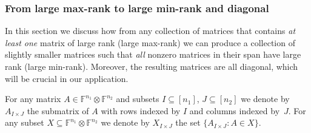 \documentclass{daj}
\newcommand{\FF}{\mathbb{F}}
\begin{document}
%
%

%
%
%

%
%

%
%

%
%
%

%
%
%

%
%
%


%
%
%

%
%

%


%

%

%

%

%
%
%
%
%

%
%

%
%



%


%
%
%

%
%
%


%
%
%
%

%
%
%
%

%
%
%

%
%
%

%

%

%

%
%

%
%
%

%
%
%
%

%
%
%
%
%

%

%
%
%

%
%
%
%
%

%
%
%
%
%
%
%

%

\subsubsection{From large max-rank to large min-rank and diagonal}\label{subsec:maxrank-minrank}

In this section we discuss how from any collection of matrices that contains \emph{at least one} matrix of large rank (large max-rank) we can produce a collection of slightly smaller matrices such that \emph{all} nonzero matrices in their span have large rank (large min-rank). Moreover, the resulting matrices are all diagonal, which will be crucial in our application.

For any matrix $A\in \FF^{n_1} \otimes \FF^{n_2}$ %
and subsets $I\subseteq [n_1]$, $J\subseteq [n_2]$ we denote by $A_{I\times J}$ the submatrix of $A$ with rows indexed by $I$ and columns indexed by~$J$.  For any subset $X \subseteq \FF^{n_1} \otimes \FF^{n_2}$ we denote by $X_{I \times J}$ the set $\{A_{I\times J} : A \in X\}$.
\end{document}
